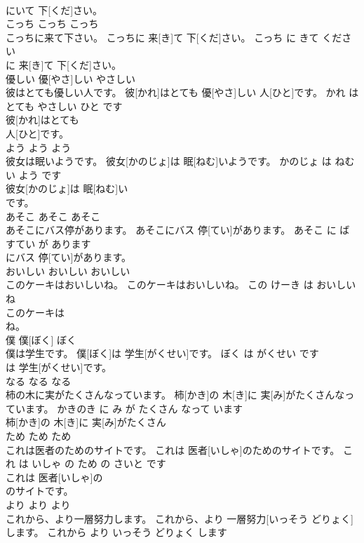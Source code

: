 \documentclass[8pt]{extreport}
\begin{document}
\begin{CJK}{UTF8}{min}
\\	にいて 下[くだ]さい。			
\\	こっち	こっち	こっち	
\\	こっちに来て下さい。	こっちに 来[き]て 下[くだ]さい。	こっち に きて ください	
\\	に 来[き]て 下[くだ]さい。			
\\	優しい	優[やさ]しい	やさしい	
\\	彼はとても優しい人です。	彼[かれ]はとても 優[やさ]しい 人[ひと]です。	かれ は とても やさしい ひと です	
\\	彼[かれ]はとても
\\	人[ひと]です。			
\\	よう	よう	よう	
\\	彼女は眠いようです。	彼女[かのじょ]は 眠[ねむ]いようです。	かのじょ は ねむい よう です	
\\	彼女[かのじょ]は 眠[ねむ]い
\\	です。			
\\	あそこ	あそこ	あそこ	
\\	あそこにバス停があります。	あそこにバス 停[てい]があります。	あそこ に ばすてい が あります	
\\	にバス 停[てい]があります。			
\\	おいしい	おいしい	おいしい	
\\	このケーキはおいしいね。	このケーキはおいしいね。	この けーき は おいしい ね	
\\	このケーキは
\\	ね。			
\\	僕	僕[ぼく]	ぼく	
\\	僕は学生です。	僕[ぼく]は 学生[がくせい]です。	ぼく は がくせい です	
\\	は 学生[がくせい]です。			
\\	なる	なる	なる	
\\	柿の木に実がたくさんなっています。	柿[かき]の 木[き]に 実[み]がたくさんなっています。	かきのき に み が たくさん なって います	
\\	柿[かき]の 木[き]に 実[み]がたくさん
\\	ため	ため	ため	
\\	これは医者のためのサイトです。	これは 医者[いしゃ]のためのサイトです。	これ は いしゃ の ため の さいと です	
\\	これは 医者[いしゃ]の
\\	のサイトです。			
\\	より	より	より	
\\	これから、より一層努力します。	これから、より 一層努力[いっそう どりょく]します。	これから より いっそう どりょく します	

\end{CJK}
\end{document}
